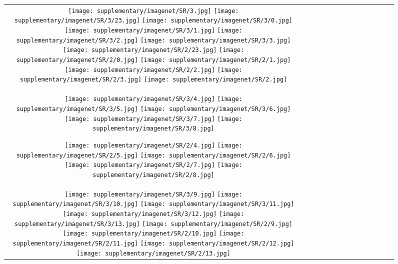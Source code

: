 \begin{figure*}[tb!]
    \centering
    \setlength{\tabcolsep}{0.5pt}
    {\small
    \renewcommand{\arraystretch}{0.5} 
    \begin{tabular}{c c c c c c c c c c c c c c }
    \captionsetup{type=figure, font=scriptsize}
  \texttt{[image: supplementary/imagenet/SR/3.jpg]}
  \texttt{[image: supplementary/imagenet/SR/3/23.jpg]}
  \texttt{[image: supplementary/imagenet/SR/3/0.jpg]}
  \texttt{[image: supplementary/imagenet/SR/3/1.jpg]}
  \texttt{[image: supplementary/imagenet/SR/3/2.jpg]}
  \texttt{[image: supplementary/imagenet/SR/3/3.jpg]}
    \hspace{5mm}
  \texttt{[image: supplementary/imagenet/SR/2/23.jpg]}
  \texttt{[image: supplementary/imagenet/SR/2/0.jpg]}
  \texttt{[image: supplementary/imagenet/SR/2/1.jpg]}
  \texttt{[image: supplementary/imagenet/SR/2/2.jpg]}
  \texttt{[image: supplementary/imagenet/SR/2/3.jpg]}
  \texttt{[image: supplementary/imagenet/SR/2.jpg]}

 \tabularnewline
  \texttt{[image: supplementary/imagenet/SR/3/4.jpg]}
  \texttt{[image: supplementary/imagenet/SR/3/5.jpg]}
  \texttt{[image: supplementary/imagenet/SR/3/6.jpg]}
  \texttt{[image: supplementary/imagenet/SR/3/7.jpg]}
  \texttt{[image: supplementary/imagenet/SR/3/8.jpg]}
    \hspace{5mm}
    
  \texttt{[image: supplementary/imagenet/SR/2/4.jpg]}
  \texttt{[image: supplementary/imagenet/SR/2/5.jpg]}
  \texttt{[image: supplementary/imagenet/SR/2/6.jpg]}
  \texttt{[image: supplementary/imagenet/SR/2/7.jpg]}
  \texttt{[image: supplementary/imagenet/SR/2/8.jpg]}
\tabularnewline
  \texttt{[image: supplementary/imagenet/SR/3/9.jpg]}
  \texttt{[image: supplementary/imagenet/SR/3/10.jpg]}
  \texttt{[image: supplementary/imagenet/SR/3/11.jpg]}
  \texttt{[image: supplementary/imagenet/SR/3/12.jpg]}
  \texttt{[image: supplementary/imagenet/SR/3/13.jpg]}
    \hspace{5mm}
  \texttt{[image: supplementary/imagenet/SR/2/9.jpg]}
  \texttt{[image: supplementary/imagenet/SR/2/10.jpg]}
  \texttt{[image: supplementary/imagenet/SR/2/11.jpg]}
  \texttt{[image: supplementary/imagenet/SR/2/12.jpg]}
  \texttt{[image: supplementary/imagenet/SR/2/13.jpg]}


\end{tabular}}
\end{figure*}
